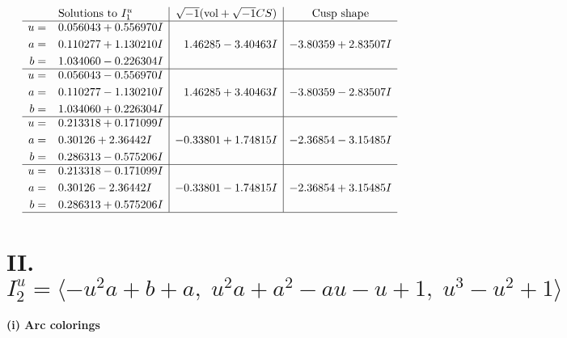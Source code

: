 \documentclass[1p]{elsarticle_modified}
\theoremstyle{definition}
\newcommand{\I}{\sqrt{-1}}
\begin{document}
$$\begin{array}{c|c|c}
\text{Solutions to }I^u_{1}& \I (\text{vol} + \sqrt{-1}CS) & \text{Cusp shape}\\
 \hline 
\begin{aligned}
u &= \phantom{-}0.056043 + 0.556970 I \\
a &= \phantom{-}0.110277 + 1.130210 I \\
b &= \phantom{-}1.034060 - 0.226304 I\end{aligned}
 & \phantom{-}1.46285 - 3.40463 I & -3.80359 + 2.83507 I \\ \hline\begin{aligned}
u &= \phantom{-}0.056043 - 0.556970 I \\
a &= \phantom{-}0.110277 - 1.130210 I \\
b &= \phantom{-}1.034060 + 0.226304 I\end{aligned}
 & \phantom{-}1.46285 + 3.40463 I & -3.80359 - 2.83507 I \\ \hline\begin{aligned}
u &= \phantom{-}0.213318 + 0.171099 I \\
a &= \phantom{-}0.30126 + 2.36442 I \\
b &= \phantom{-}0.286313 - 0.575206 I\end{aligned}
 & -0.33801 + 1.74815 I & -2.36854 - 3.15485 I \\ \hline\begin{aligned}
u &= \phantom{-}0.213318 - 0.171099 I \\
a &= \phantom{-}0.30126 - 2.36442 I \\
b &= \phantom{-}0.286313 + 0.575206 I\end{aligned}
 & -0.33801 - 1.74815 I & -2.36854 + 3.15485 I\\
 \hline 
 \end{array}$$\newpage\newpage\renewcommand{\arraystretch}{1}
\centering \section*{II. $I^u_{2}= \langle - u^2 a+b+a,\;u^2 a+a^2- a u- u+1,\;u^3- u^2+1 \rangle$}
\flushleft \textbf{(i) Arc colorings}\\
\end{document}
